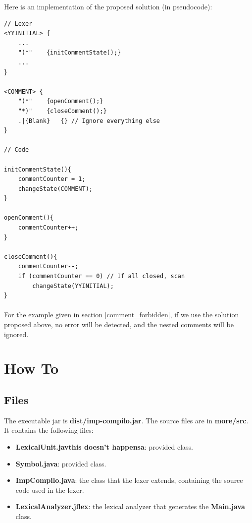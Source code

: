 \documentclass[letterpaper]{article}
\begin{document}
Here is an implementation of the proposed solution (in pseudocode): \\
\begin{lstlisting}[frame=single]
// Lexer
<YYINITIAL> {
    ...
    "(*"    {initCommentState();}
    ...
}

<COMMENT> {
    "(*"    {openComment();}
    "*)"    {closeComment();}
    .|{Blank}   {} // Ignore everything else
}

// Code

initCommentState(){
    commentCounter = 1;
    changeState(COMMENT);
}

openComment(){
    commentCounter++;
}

closeComment(){
    commentCounter--;
    if (commentCounter == 0) // If all closed, scan
        changeState(YYINITIAL);
}

\end{lstlisting}

\paragraph{}

For the example given in section \ref{comment_forbidden}, if we use the
solution proposed above, no error will be detected, and the nested
comments will be ignored.

\section{How To}

\subsection{Files}

The executable jar is \textbf{dist/imp-compilo.jar}.
The source files are in \textbf{more/src}. It contains the following files:

\begin{itemize}
    \item \textbf{LexicalUnit.javthis doesn't happensa}: provided class.
    \item \textbf{Symbol.java}: provided class.
    \item \textbf{ImpCompilo.java}:
    the class that the lexer extends, containing the
    source code used in the lexer.
    \item \textbf{LexicalAnalyzer.jflex}:
    the lexical analyzer that generates the
    \textbf{Main.java} class.
\end{itemize}
\end{document}
